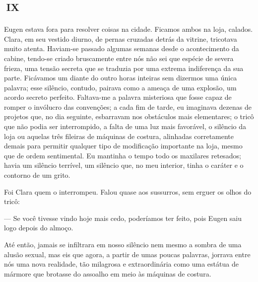 

\chapter*{\small{}\,\Large\centering\textsc{ix}\,\small{}}

Eugen estava fora para resolver coisas na cidade. Ficamos ambos na loja, calados. Clara, em seu vestido diurno, de pernas cruzadas detrás da vitrine, tricotava muito atenta. Haviam-se passado algumas semanas desde o acontecimento da cabine, tendo-se criado bruscamente entre nós não sei que espécie de severa frieza, uma tensão secreta que se traduzia por uma extrema indiferença da sua parte. Ficávamos um diante do outro horas inteiras sem dizermos uma única palavra; esse silêncio, contudo, pairava como a ameaça de uma explosão, um acordo secreto perfeito. Faltava-me a palavra misteriosa que fosse capaz de romper o invólucro das convenções; a cada fim de tarde, eu imaginava dezenas de projetos que, no dia seguinte, esbarravam nos obstáculos mais elementares; o tricô que não podia ser interrompido, a falta de uma luz mais favorável, o silêncio da loja ou aquelas três fileiras de máquinas de costura, alinhadas corretamente demais para permitir qualquer tipo de modificação importante na loja, mesmo que de ordem sentimental. Eu mantinha o tempo todo os maxilares retesados; havia um silêncio terrível, um silêncio que, no meu interior, tinha o caráter e o contorno de um grito.

Foi Clara quem o interrompeu. Falou quase aos sussurros, sem erguer os olhos do tricô:

--- Se você tivesse vindo hoje mais cedo, poderíamos ter feito, pois Eugen saiu logo depois do almoço.

Até então, jamais se infiltrara em nosso silêncio nem mesmo a sombra de uma alusão sexual, mas eis que agora, a partir de umas poucas palavras, jorrava entre nós uma nova realidade, tão milagrosa e extraordinária como uma estátua de mármore que brotasse do assoalho em meio às máquinas de costura.

